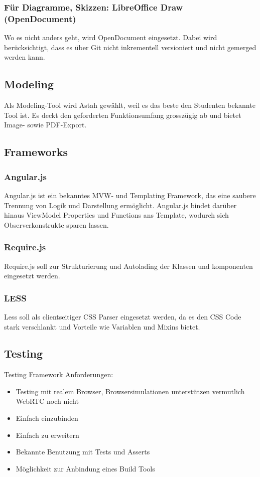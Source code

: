 			\subsubsection{Für Diagramme, Skizzen: LibreOffice Draw (OpenDocument)}
				Wo es nicht anders geht, wird OpenDocument eingesetzt. Dabei wird
				berücksichtigt, dass es über Git nicht inkrementell versioniert und nicht
				gemerged werden kann.


		\subsection{Modeling}
			Als Modeling-Tool wird Astah gewählt, weil es das beste den Studenten
			bekannte Tool ist.
			Es deckt den geforderten Funktionsumfang grosszügig ab und bietet Image- sowie
			PDF-Export.

			
		


		\subsection{Frameworks}
			\subsubsection{Angular.js}
				Angular.js ist ein bekanntes MVW- und Templating Framework, das eine saubere Trennung von Logik und Darstellung ermöglicht. Angular.js bindet darüber hinaus ViewModel Properties und Functions ans Template, wodurch sich Observerkonstrukte sparen lassen.

			\subsubsection{Require.js}
				Require.js soll zur Strukturierung und Autolading der Klassen und komponenten eingesetzt werden.

			\subsubsection{LESS}
				Less soll als clientseitiger CSS Parser eingesetzt werden, da es den CSS Code stark verschlankt und Vorteile wie Variablen und Mixins bietet.


		\subsection{Testing}
			Testing Framework Anforderungen:
			\begin{itemize}
				\setlength{\itemsep}{-\parsep}
				\item Testing mit realem Browser, Browsersimulationen unterstützen vermutlich WebRTC noch nicht
				\item Einfach einzubinden
				\item Einfach zu erweitern
				\item Bekannte Benutzung mit Tests und Asserts
				\item Möglichkeit zur Anbindung eines Build Tools
			\end{itemize}


